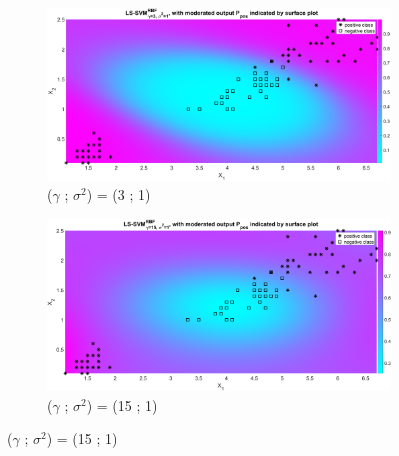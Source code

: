 {\begin{figure}[!htbp]
\begin{subfigure}{.33\textwidth}
		\label{fig:gam0.1_sig1}
	\end{subfigure}%
	\begin{subfigure}{.33\textwidth}
		\centering
		\includegraphics[height=0.8\linewidth,width=1\linewidth]{Exercise1/Report/Ex1.3.4_gam3_sig1.eps}
		\caption{($\gamma$ ; $\sigma^2$) = (3 ; 1)}
		\label{fig:gam3_sig1}
	\end{subfigure}%
	\begin{subfigure}{.33\textwidth}
		\centering
		\includegraphics[height=0.8\linewidth,width=1\linewidth]{Exercise1/Report/Ex1.3.4_gam15_sig1.eps}
		\caption{($\gamma$ ; $\sigma^2$) = (15 ; 1)}

\end{subfigure}
\end{figure}}
